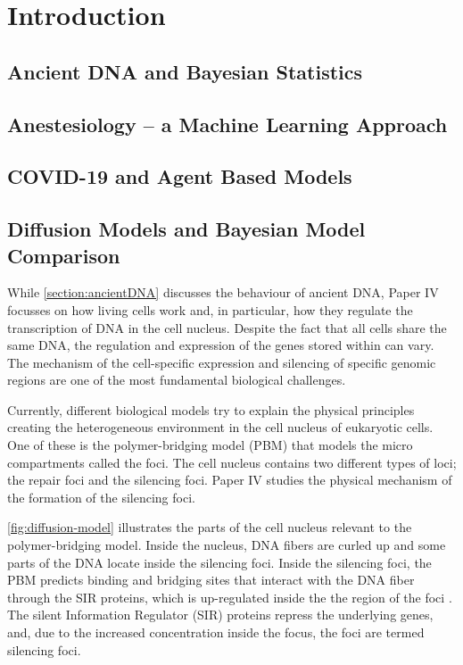 
\chapter{Introduction}
\label{chapter:introduction}



\section{Ancient DNA and Bayesian Statistics}
\label{section:ancientDNA}



\section{Anestesiology -- a Machine Learning Approach }
\label{section:machine-learning}


\section{COVID-19 and Agent Based Models}
\label{section:agent-based-models}


\section{Diffusion Models and Bayesian Model Comparison}
\label{section:diffusion}

While \autoref{section:ancientDNA} discusses the behaviour of ancient DNA, Paper IV focusses on how living cells work and, in particular, how they regulate the transcription of DNA in the cell nucleus.
Despite the fact that all cells share the same DNA, the regulation and expression of the genes stored within can vary. The mechanism of the cell-specific expression and silencing of specific genomic regions are one of the most fundamental biological challenges.

Currently, different biological models try to explain the physical principles creating the heterogeneous environment in the cell nucleus of eukaryotic cells.
One of these is the polymer-bridging model (PBM) that models the micro compartments called the foci. The cell nucleus contains two different types of loci; the repair foci and the silencing foci. Paper IV studies the physical mechanism of the formation of the silencing foci.

\autoref{fig:diffusion-model} illustrates the parts of the cell nucleus relevant to the polymer-bridging model. Inside the nucleus, DNA fibers are curled up and some parts of the DNA locate inside the silencing foci. Inside the silencing foci, the PBM predicts binding and bridging sites that interact with the DNA fiber through the SIR proteins, which is up-regulated inside the the region of the foci \autocite{heltbergPhysicalObservablesDetermine2021}. The silent Information Regulator (SIR) proteins repress the underlying genes, and, due to the increased concentration inside the focus, the foci are termed silencing foci.

